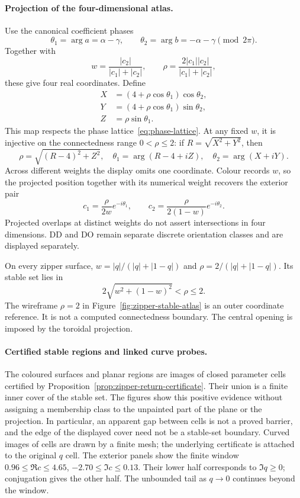 \paragraph{Projection of the four-dimensional atlas.}
Use the canonical coefficient phases
\[
 \theta_1=\arg a=\alpha-\gamma,\qquad
 \theta_2=\arg b=-\alpha-\gamma
 \pmod{2\pi}.
\]
Together with
\begin{equation}\label{eq:exterior-weight-radial}
 w=\frac{|c_2|}{|c_1|+|c_2|},\qquad
 \rho=\frac{2|c_1||c_2|}{|c_1|+|c_2|},
\end{equation}
these give four real coordinates. Define
\begin{equation}\label{eq:zipper-three-dimensional-projection}
\begin{split}
 X&=(4+\rho\cos\theta_1)\cos\theta_2,\\
 Y&=(4+\rho\cos\theta_1)\sin\theta_2,\\
 Z&=\rho\sin\theta_1.
\end{split}
\end{equation}
This map respects the phase lattice~\eqref{eq:phase-lattice}. At any
fixed $w$, it is injective on the connectedness range $0<\rho\le2$:
if $R=\sqrt{X^2+Y^2}$, then
\[
 \rho=\sqrt{(R-4)^2+Z^2},\quad
 \theta_1=\arg(R-4+iZ),\quad
 \theta_2=\arg(X+iY).
\]
Across different weights the display omits one coordinate. Colour
records $w$, so the projected position together with its numerical
weight recovers the exterior pair
\[
 c_1=\frac{\rho}{2w}e^{-i\theta_1},\qquad
 c_2=\frac{\rho}{2(1-w)}e^{-i\theta_2}.
\]
Projected overlaps at distinct weights do not assert intersections
in four dimensions. DD and DO remain separate discrete orientation
classes and are displayed separately.

On every zipper surface,
$w=|q|/(|q|+|1-q|)$ and $\rho=2/(|q|+|1-q|)$. Its stable set lies in
\begin{equation}\label{eq:exterior-stable-band}
 2\sqrt{w^2+(1-w)^2}<\rho\le2.
\end{equation}
The wireframe $\rho=2$ in Figure~\ref{fig:zipper-stable-atlas} is an
outer coordinate reference. It is not a computed connectedness
boundary. The central opening is imposed by the toroidal projection.

\paragraph{Certified stable regions and linked curve probes.}
The coloured surfaces and planar regions are images of closed parameter
cells certified by Proposition~\ref{prop:zipper-return-certificate}.
Their union is a finite inner cover of the stable set. The figures
show this positive evidence without assigning a membership class to
the unpainted part of the plane or the projection. In particular,
an apparent gap between cells is not a proved barrier, and the edge
of the displayed cover need not be a stable-set boundary. Curved
images of cells are drawn by a finite mesh; the underlying
certificate is attached to the original $q$ cell. The exterior panels
show the finite window $0.96\le\Re c\le4.65$,
$-2.70\le\Im c\le0.13$. Their lower half corresponds to
$\Im q\ge0$; conjugation gives the other half. The unbounded
tail as $q\to0$ continues beyond the window.

